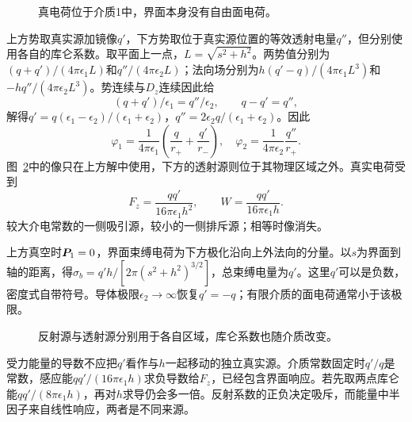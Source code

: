 \begin{figure}[H]\centering
{}
\caption{真电荷位于介质1中，界面本身没有自由面电荷。}\label{fig:es4-e9-q}
\end{figure}
\begin{solution}
上方势取真实源加镜像$q'$，下方势取位于真实源位置的等效透射电量$q''$，但分别使用各自的库仑系数。取平面上一点，$L=\sqrt{s^2+h^2}$。两势值分别为$(q+q')/(4\pi\epsilon_1L)$和$q''/(4\pi\epsilon_2L)$；法向场分别为$h(q'-q)/(4\pi\epsilon_1L^3)$和$-hq''/(4\pi\epsilon_2L^3)$。势连续与$D_z$连续因此给
\[(q+q')/\epsilon_1=q''/\epsilon_2,\qquad q-q'=q'',
\]
解得$q'=q(\epsilon_1-\epsilon_2)/(\epsilon_1+\epsilon_2)$，$q''=2\epsilon_2q/(\epsilon_1+\epsilon_2)$。因此
\[\varphi_1=\frac1{4\pi\epsilon_1}\left(\frac q{r_+}+\frac{q'}{r_-}\right),\quad
\varphi_2=\frac1{4\pi\epsilon_2}\frac{q''}{r_+}.
\]
图~\ref{fig:es4-e9-s}中的像只在上方解中使用，下方的透射源则位于其物理区域之外。真实电荷受到
\[F_z=\frac{qq'}{16\pi\epsilon_1h^2},\qquad
W=\frac{qq'}{16\pi\epsilon_1h}.
\]
较大介电常数的一侧吸引源，较小的一侧排斥源；相等时像消失。

上方真空时$\bm{P}_1=0$，界面束缚电荷为下方极化沿向上外法向的分量。以$s$为界面到轴的距离，得$\sigma_b=q'h/[2\pi(s^2+h^2)^{3/2}]$，总束缚电量为$q'$。这里$q'$可以是负数，密度式自带符号。导体极限$\epsilon_2\to\infty$恢复$q'=-q$；有限介质的面电荷通常小于该极限。
\begin{figure}[H]\centering
{}
\caption{反射源与透射源分别用于各自区域，库仑系数也随介质改变。}\label{fig:es4-e9-s}
\end{figure}


受力能量的导数不应把$q'$看作与$h$一起移动的独立真实源。介质常数固定时$q'/q$是常数，感应能$qq'/(16\pi\epsilon_1h)$求负导数给$F_z$，已经包含界面响应。若先取两点库仑能$qq'/(8\pi\epsilon_1h)$，再对$h$求导仍会多一倍。反射系数的正负决定吸斥，而能量中半因子来自线性响应，两者是不同来源。
\end{solution}

